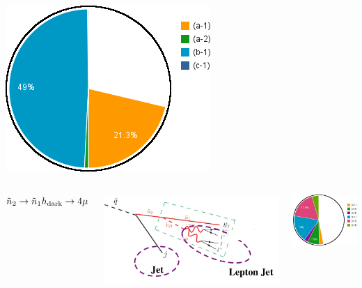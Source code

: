 \documentclass[compress]{beamer}
\newcommand{\s}[1]{{\mbox{\scriptsize #1}}}
\begin{document}
\begin{frame}
\begin{columns}
\includegraphics[width=\linewidth]{chart2d_2mu_600.png}
\end{columns}

\vspace{0.25 cm}
\begin{columns}
\mbox{$\tilde{n}_2 \to \tilde{n}_1 h_\s{dark} \to 4\mu$}

\includegraphics[width=\linewidth]{diagram_squark_4mu.png}

\includegraphics[width=\linewidth]{chart2d_4mu_200.png}


\end{columns}
\end{frame}
\end{document}
